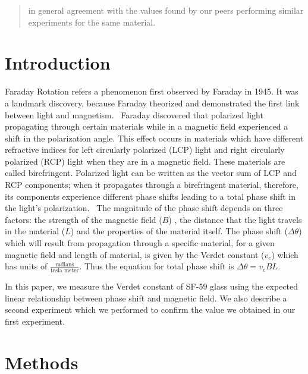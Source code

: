 \documentclass[prb,preprint]{revtex4-1}
\begin{document}
\begin{abstract}
in general agreement with the values found by our peers performing similar experiments for the same material. 

\end{abstract}

\maketitle %


\section{Introduction} %

Faraday Rotation refers a phenomenon first observed by Faraday in 1945. It was a landmark discovery, because Faraday theorized and demonstrated the first link between light and magnetism.~\cite{teachspin} Faraday discovered that polarized light propagating through certain materials while in a magnetic field experienced a shift in the polarization angle. This effect occurs in materials which have different refractive indices for left circularly polarized (LCP) light and right circularly polarized (RCP) light when they are in a magnetic field. These materials are called birefringent. Polarized light can be written as the vector sum of LCP and RCP components; when it propagates through a birefringent material, therefore, its components experience different phase shifts leading to a total phase shift in the light's polarization.~\cite{melissanos} The magnitude of the phase shift depends on three factors: the strength of the magnetic field ($B$) , the distance that the light travels in the material ($L$) and the properties of the material itself. The phase shift ($\Delta\theta$) which will result from propagation through a specific material, for a given magnetic field and length of material, is given by the Verdet constant ($v_c$) which has units of $\frac{\text{radians}}{\text{tesla\ meter}}$. Thus the equation for total phase shift is $\Delta \theta = v_c B L$.



In this paper, we measure the Verdet constant of SF-59 glass using the expected linear relationship between phase shift and magnetic field. We also describe a second experiment which we performed to confirm the value we obtained in our first experiment.


\section{Methods}
\end{document}
